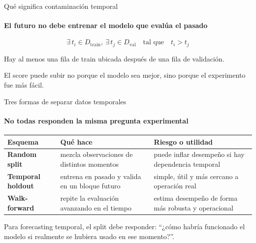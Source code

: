 \documentclass[aspectratio=169,11pt]{beamer}  %
\newcommand{\hrow}{\rowcolor{mlcream}}
\newcommand{\Lg}{\fontsize{16}{20}\selectfont}
\newcommand{\bigstate}[1]{\begin{center}\Lg #1\end{center}}
\begin{document}

\begin{frame}{Qué significa contaminación temporal}
\framesubtitle{El futuro no debe entrenar el modelo que evalúa el pasado}
{\Large\[ \exists\, t_i \in D_{\mathrm{train}},\ \exists\, t_j \in D_{\mathrm{val}} \quad \text{tal que} \quad t_i > t_j \]}
\begin{rulebox}
\Lg Hay al menos una fila de train ubicada después de una fila de validación.
\end{rulebox}
\bigstate{El score puede subir no porque el modelo sea mejor, sino porque el experimento fue más fácil.}
\end{frame}

\begin{frame}{Tres formas de separar datos temporales}
\framesubtitle{No todas responden la misma pregunta experimental}
\centering
\begin{tabular}{@{}l P{0.34\textwidth} P{0.36\textwidth}@{}}
\toprule
\hrow \textbf{Esquema} & Qué hace & Riesgo o utilidad\\
\midrule
\textbf{Random split} & mezcla observaciones de distintos momentos & puede inflar desempeño si hay dependencia temporal\\
\textbf{Temporal holdout} & entrena en pasado y valida en un bloque futuro & simple, útil y más cercano a operación real\\
\textbf{Walk-forward} & repite la evaluación avanzando en el tiempo & estima desempeño de forma más robusta y operacional\\
\bottomrule
\end{tabular}
\vspace{0.8em}
\begin{rulebox}[Regla]
Para forecasting temporal, el split debe responder: ``¿cómo habría funcionado el modelo si realmente se hubiera usado en ese momento?''.
\end{rulebox}
\end{frame}
\end{document}
